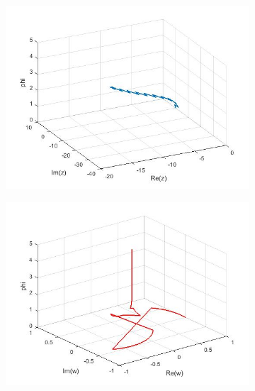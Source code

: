\documentclass[a4paper,11pt]{article}
\begin{document}
\newpage
\begin{figure}[!h]
\begin{subfigure}[c]{0.5\textwidth}
\includegraphics[width=\linewidth]{19.jpg}
\end{subfigure}
\begin{subfigure}[c]{0.5\textwidth}
\includegraphics[width=\linewidth]{20.jpg}
\end{subfigure}
\begin{subfigure}[c]{0.5\textwidth}

\end{subfigure}
\end{figure}
\end{document}
